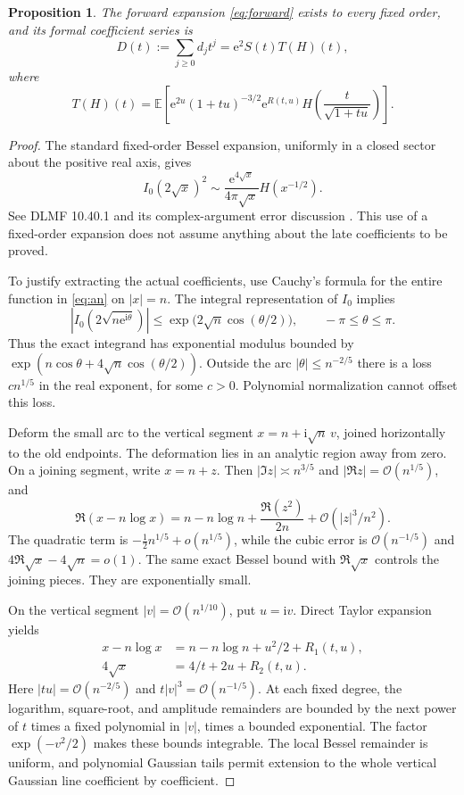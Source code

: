 \documentclass[11pt,letterpaper]{article}
\numberwithin{equation}{section}
\newtheorem{proposition}[theorem]{Proposition}
\theoremstyle{remark}\newtheorem{remark}[theorem]{Remark}
\newcommand{\E}{\mathbb E}
\newcommand{\e}{\mathrm e}
\newcommand{\ii}{\mathrm i}
\newcommand{\Ord}{\mathcal O}
\begin{document}
\begin{proposition}\label{prop:transform}
The forward expansion \eqref{eq:forward} exists to every fixed order, and its formal coefficient series is
\begin{equation}\label{eq:transform}
 D(t):=\sum_{j\ge0}d_jt^j=\e^2 S(t)T(H)(t),
\end{equation}
where
\begin{equation}\label{eq:T}
 T(H)(t)=\E\left[\e^{2u}(1+tu)^{-3/2}\e^{R(t,u)}
                       H\!\left(\frac{t}{\sqrt{1+tu}}\right)\right].
\end{equation}
\end{proposition}
\begin{proof}
The standard fixed-order Bessel expansion, uniformly in a closed sector about the positive real axis, gives
\begin{equation}\label{eq:bessel}
 I_0(2\sqrt{x})^2\sim\frac{\e^{4\sqrt{x}}}{4\pi\sqrt{x}}H(x^{-1/2}).
\end{equation}
See DLMF 10.40.1 and its complex-argument error discussion \cite{dlmfbessel}. This use of a fixed-order expansion does not assume anything about the late coefficients to be proved.

To justify extracting the actual coefficients, use Cauchy's formula for the entire function in \eqref{eq:an} on $|x|=n$. The integral representation of $I_0$ implies
\[
 |I_0(2\sqrt{n\e^{\ii\theta}})|\le
 \exp\bigl(2\sqrt n\cos(\theta/2)\bigr),\qquad -\pi\le\theta\le\pi.
\]
Thus the exact integrand has exponential modulus bounded by
$\exp(n\cos\theta+4\sqrt n\cos(\theta/2))$. Outside the arc
$|\theta|\le n^{-2/5}$ there is a loss $c n^{1/5}$ in the real exponent, for some $c>0$. Polynomial normalization cannot offset this loss.

Deform the small arc to the vertical segment $x=n+\ii\sqrt n\,v$, joined horizontally to the old endpoints. The deformation lies in an analytic region away from zero. On a joining segment, write $x=n+z$. Then $|\Im z|\asymp n^{3/5}$ and $|\Re z|=\Ord(n^{1/5})$, and
\[
 \Re(x-n\log x)=n-n\log n+\frac{\Re(z^2)}{2n}
                            +\Ord(|z|^3/n^2).
\]
The quadratic term is $-\tfrac12n^{1/5}+o(n^{1/5})$, while the cubic error is $\Ord(n^{-1/5})$ and $4\Re\sqrt{x}-4\sqrt n=o(1)$. The same exact Bessel bound with $\Re\sqrt{x}$ controls the joining pieces. They are exponentially small.

On the vertical segment $|v|=\Ord(n^{1/10})$, put $u=\ii v$. Direct Taylor expansion yields
\begin{align*}
 x-n\log x&=n-n\log n+u^2/2+R_1(t,u),\\
 4\sqrt{x}&=4/t+2u+R_2(t,u).
\end{align*}
Here $|tu|=\Ord(n^{-2/5})$ and $t|v|^3=\Ord(n^{-1/5})$. At each fixed degree, the logarithm, square-root, and amplitude remainders are bounded by the next power of $t$ times a fixed polynomial in $|v|$, times a bounded exponential. The factor $\exp(-v^2/2)$ makes these bounds integrable. The local Bessel remainder is uniform, and polynomial Gaussian tails permit extension to the whole vertical Gaussian line coefficient by coefficient.


\end{proof}
\end{document}
